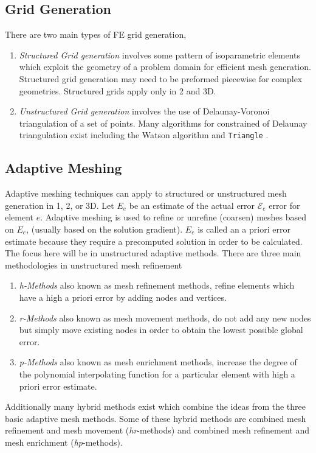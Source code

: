 \documentclass[wrr]{agutex}  %
\begin{document}
\begin{article}
\subsection{Grid Generation}
There are two main types of FE grid generation, 
\begin{enumerate} 
\item {\it Structured Grid generation} involves some pattern of isoparametric elements which exploit the geometry of a problem domain for efficient mesh generation.  Structured grid generation may need to be preformed piecewise for complex geometries.  Structured grids apply only in 2 and 3D.
\item {\it Unstructured Grid generation} involves the use of Delaunay-Voronoi triangulation of a set of points.  Many algorithms for constrained of Delaunay triangulation exist including the Watson algorithm \cite{Watson1981} and {\tt Triangle} \citep{Shewchuk1996}.
\end{enumerate}

\subsection{Adaptive Meshing}
Adaptive meshing techniques can apply to structured or unstructured mesh generation in 1, 2, or 3D.  Let $E_e$ be an estimate of the actual error $\mathcal{E}_e$ error for element $e$.  Adaptive meshing is used to refine or unrefine (coarsen) meshes based on $E_e$, (usually based on the solution gradient)\citep{Chung2002}.  $E_e$ is called an a priori error estimate because they require a precomputed solution in order to be calculated.  The focus here will be in unstructured adaptive methods. There are three main methodologies in unstructured mesh refinement
\begin{enumerate} 
\item {\it h-Methods} also known as mesh refinement methods, refine elements which have a high a priori error by adding nodes and vertices.  
\item {\it r-Methods} also known as mesh movement methods, do not add any new nodes but simply move existing nodes in order to obtain the lowest possible global error.  
\item {\it p-Methods} also known as mesh enrichment methods, increase the degree of the polynomial interpolating function for a particular element with high a priori error estimate. 
\end{enumerate}
Additionally many hybrid methods exist which combine the ideas from the three basic adaptive mesh methods.  Some of these hybrid methods are combined mesh refinement and mesh movement ({\it hr}-methods) and combined mesh refinement and mesh enrichment ({\it hp}-methods). 


\end{article}
\end{document}
